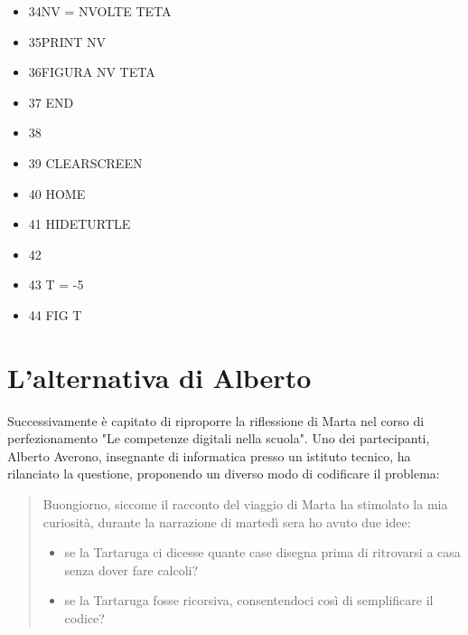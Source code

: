 \begin{minipage}{1.0\textwidth}
\begin{itemize}[itemsep=-3pt,parsep=2pt]
\item[] \hspace{0.3cm} 34\hspace{8pt}NV = NVOLTE TETA
\item[] \hspace{0.3cm} 35\hspace{8pt}PRINT NV
\item[] \hspace{0.3cm} 36\hspace{8pt}FIGURA NV TETA
\item[] \hspace{0.3cm} 37 END
\item[] \hspace{0.3cm} 38
\item[] \hspace{0.3cm} 39 CLEARSCREEN
\item[] \hspace{0.3cm} 40 HOME
\item[] \hspace{0.3cm} 41 HIDETURTLE
\item[] \hspace{0.3cm} 42
\item[] \hspace{0.3cm} 43 T = -5
\item[] \hspace{0.3cm} 44 FIG T                                                              
\end{itemize}          	          
\end{minipage}

\vskip 1cm

\section{L'alternativa di Alberto} \label{sez:alternativa-alberto}

Successivamente è capitato di riproporre la riflessione di Marta nel corso di
perfezionamento "Le competenze digitali nella scuola". Uno dei partecipanti,
Alberto Averono, insegnante di informatica presso un istituto tecnico, ha
rilanciato la questione, proponendo un diverso modo di codificare il problema:

\begin{quote} Buongiorno, siccome il racconto del viaggio di Marta ha stimolato
	la mia curiosità, durante la narrazione di martedì sera ho avuto due
	idee:

	\begin{itemize}

		\item se la Tartaruga ci dicesse quante case disegna prima di
			ritrovarsi a casa senza dover fare calcoli?

		\item se la Tartaruga fosse ricorsiva, consentendoci così di
	semplificare il codice?  \end{itemize}

\end{quote}

